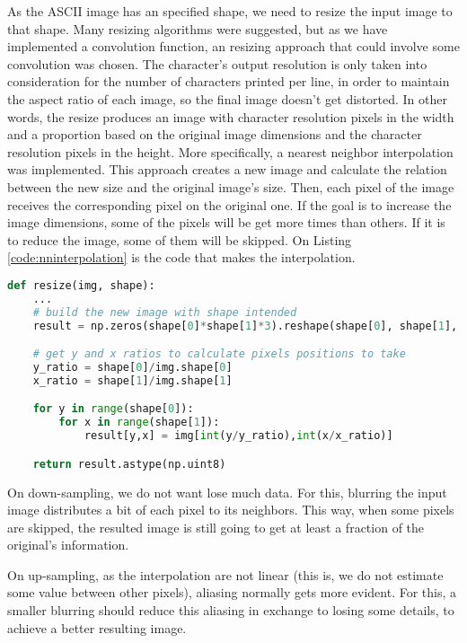 \documentclass[]{IEEEtran}
\begin{document}
 As the ASCII image has an specified shape, we need to resize the input image to that shape. Many resizing algorithms were suggested, but as we have implemented a convolution function, an resizing approach that could involve some convolution was chosen.
The character's output resolution is only taken into consideration for the number of characters printed per line, in order to maintain the aspect ratio of each image, so the final image doesn't get distorted. In other words, the resize produces an image with character resolution pixels in the width and a proportion based on the original image dimensions and the character resolution pixels in the height.
 More specifically, a nearest neighbor interpolation was implemented. This approach creates a new image and calculate the relation between the new size and the original image's size. Then, each pixel of the image receives the corresponding pixel on the original one. If the goal is to increase the image dimensions, some of the pixels will be get more times than others. If it is to reduce the image, some of them will be skipped. On Listing \ref{code:nninterpolation} is the code that makes the interpolation.
 
 \begin{lstlisting}[language=Python, caption={Nearest neighbor interpolation script}, label={code:nninterpolation}]
def resize(img, shape):
    ...
    # build the new image with shape intended
    result = np.zeros(shape[0]*shape[1]*3).reshape(shape[0], shape[1], 3)

    # get y and x ratios to calculate pixels positions to take
    y_ratio = shape[0]/img.shape[0]
    x_ratio = shape[1]/img.shape[1]

    for y in range(shape[0]):
        for x in range(shape[1]):
            result[y,x] = img[int(y/y_ratio),int(x/x_ratio)]

    return result.astype(np.uint8)
\end{lstlisting}
 
 On down-sampling, we do not want lose much data. For this, blurring the input image distributes a bit of each pixel to its neighbors. This way, when some pixels are skipped, the resulted image is still going to get at least a fraction of the original's information.
 
 On up-sampling, as the interpolation are not linear (this is, we do not estimate some value between other pixels), aliasing normally gets more evident. For this, a smaller blurring should reduce this aliasing in exchange to losing some details, to achieve a better resulting image.
 
\end{document}
